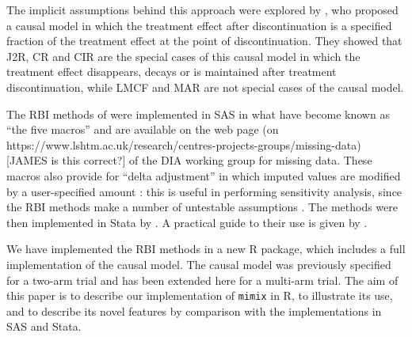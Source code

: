 The implicit assumptions behind this approach were explored by \citet{ian:RBIcausal}, who proposed a causal model in which the treatment effect after discontinuation is a specified fraction of the treatment effect at the point of discontinuation. They showed that J2R, CR and CIR are the special cases of this causal model in which the treatment effect disappears, decays or is maintained after treatment discontinuation, while LMCF and MAR are not special cases of the causal model. 

The RBI methods of \citet{Carpenter++13} were implemented in SAS in what have become known as ``the five macros'' and are available on the web page (on 
https://www.lshtm.ac.uk/research/centres-projects-groups/missing-data) [JAMES is this correct?]
of the DIA working group for missing data. These macros also provide for ``delta adjustment'' in which imputed values are modified by a user-specified amount \citep{Ratitch++13}: this is useful in performing sensitivity analysis, since the RBI methods make a number of untestable assumptions \citep{ian:ZAMSTAR}.
The methods were then implemented in Stata by \citet{Cro++16}.
A practical guide to their use is given by \citet{Cro++20}.

We have implemented the RBI methods in a new R package, which includes a full implementation of the causal model. 
The causal model was previously specified for a two-arm trial and has been extended here for a multi-arm trial.
The aim of this paper is to describe our implementation of \texttt{mimix} in R, to illustrate its use, and to describe its novel features by comparison with the implementations in SAS and Stata.

%
%

%
%

